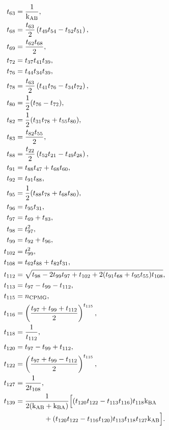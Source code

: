 \begin{latexonly}
\begin{subequations}
\begin{align}
     t_{63} &= \frac{1}{\textrm{k}_{\textrm{AB}}}, \\
     t_{68} &= \frac{t_{63}}{2} \left(t_{49} t_{54} - t_{52} t_{51} \right), \\
     t_{69} &= \frac{t_{62} t_{68}}{2}, \\
     t_{72} &= t_{37} t_{41} t_{39}, \\
     t_{76} &= t_{44} t_{34} t_{39}, \\
     t_{78} &= \frac{t_{63}}{2} \left(t_{41} t_{76} - t_{34} t_{72} \right), \\
     t_{80} &= \frac{1}{2} (t_{76} - t_{72}), \\
     t_{82} &= \frac{1}{2} (t_{31} t_{78} + t_{55} t_{80}), \\
     t_{83} &= \frac{t_{82} t_{55}}{2}, \\
     t_{88} &= \frac{t_{22}}{2} \left(t_{52} t_{21} - t_{49} t_{28} \right), \\
     t_{91} &= t_{88} t_{47} + t_{68} t_{60}, \\
     t_{92} &= t_{91} t_{88}, \\
     t_{95} &= \frac{1}{2} (t_{88} t_{78} + t_{68} t_{80}), \\
     t_{96} &= t_{95} t_{31}, \\
     t_{97} &= t_{69} + t_{83}, \\
     t_{98} &= t_{97}^2, \\
     t_{99} &= t_{92} + t_{96}, \\
    t_{102} &= t_{99}^2, \\
    t_{108} &= t_{62} t_{88} + t_{82} t_{31}, \\
    t_{112} &= \sqrt{t_{98} - 2 t_{99} t_{97} + t_{102} + 2 (t_{91} t_{68} + t_{95} t_{55}) t_{108}}, \\
    t_{113} &= t_{97} - t_{99} - t_{112}, \\
    t_{115} &= n_{\textrm{CPMG}}, \\
    t_{116} &= \left( \frac{t_{97} + t_{99} + t_{112}}{2} \right)^{t_{115}}, \\
    t_{118} &= \frac{1}{t_{112}}, \\
    t_{120} &= t_{97} - t_{99} + t_{112}, \\
    t_{122} &= \left( \frac{t_{97} + t_{99} - t_{112}}{2} \right)^{t_{115}}, \\
    t_{127} &= \frac{1}{2 t_{108}}, \\
    t_{139} &= \frac{1}{2(\textrm{k}_{\textrm{AB}} + \textrm{k}_{\textrm{BA}})} \Big[ (t_{120} t_{122} - t_{113} t_{116}) t_{118} \textrm{k}_{\textrm{BA}} \nonumber \\
            & \qquad \qquad                   + (t_{120} t_{122} - t_{116} t_{120}) t_{113} t_{118} t_{127} \textrm{k}_{\textrm{AB}} \Big].
\end{align}
\end{subequations}
\end{latexonly}

